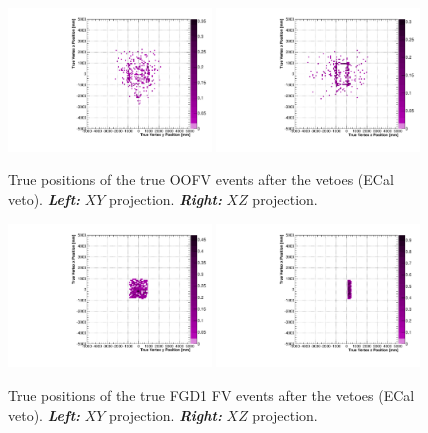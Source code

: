 \begin{figure}[ht]
  \center
  \includegraphics[width=0.48\textwidth]{images/AppOOFV/2_11.pdf}
  \includegraphics[width=0.48\textwidth]{images/AppOOFV/3_11.pdf}
  \caption[True positions of the OOFV events after the vetoes]{True
    positions of the true \Gls{OOFV} events after the vetoes
    (\Gls{ECal} veto). \textbf{\textit{Left:}} $XY$
    projection. \textbf{\textit{Right:}} $XZ$ projection.}
  \label{fig:truepositionwithvetoes}
\end{figure}

\begin{figure}[ht]
  \center
  \includegraphics[width=0.48\textwidth]{images/AppOOFV/0_11.pdf}
  \includegraphics[width=0.48\textwidth]{images/AppOOFV/1_11.pdf}
  \caption[True positions of the FGD1 FV events after the vetoes]{True
    positions of the true \Gls{FGD}1 \Gls{FV} events after the vetoes
    (\Gls{ECal} veto). \textbf{\textit{Left:}} $XY$
    projection. \textbf{\textit{Right:}} $XZ$ projection.}
  \label{fig:truepositioninfgd}
\end{figure}




